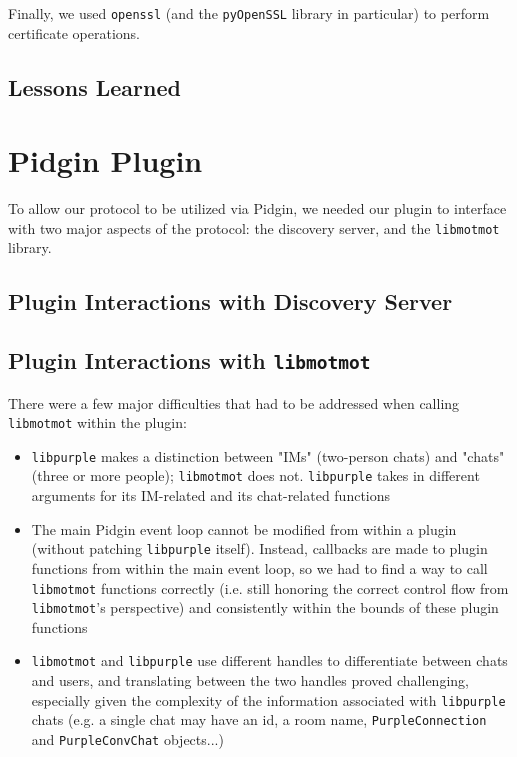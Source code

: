 \documentclass{sig-alternate}
\newcommand\libmotmot{\texttt{libmotmot}\xspace}
\newcommand\libpurple{\texttt{libpurple}\xspace}
\begin{document}
Finally, we used \texttt{openssl} (and the \texttt{pyOpenSSL} library in
particular) to perform certificate operations.

\subsection{Lessons Learned}


\section{Pidgin Plugin}

To allow our protocol to be utilized via Pidgin, we needed our plugin to
interface with two major aspects of the protocol: the discovery server, and the
\libmotmot library.

\subsection{Plugin Interactions with Discovery Server}


\subsection{Plugin Interactions with \libmotmot}
There were a few major difficulties that had to be addressed when calling
\libmotmot within the plugin:

\begin{itemize}
\item \libpurple makes a distinction between "IMs" (two-person chats) and
"chats" (three or more people); \libmotmot does not.  \libpurple takes in
different arguments for its IM-related and its chat-related functions

\item The main Pidgin event loop cannot be modified from within a plugin
(without patching \libpurple itself).  Instead, callbacks are made to plugin
functions from within the main event loop, so we had to find a way to call
\libmotmot functions correctly (i.e. still honoring the correct control flow
from \libmotmot's perspective) and consistently within the bounds of these
plugin functions

\item \libmotmot and \libpurple use different handles to differentiate between
chats and users, and translating between the two handles proved challenging,
especially given the complexity of the information associated with \libpurple
chats (e.g. a single chat may have an id, a room name, \verb`PurpleConnection`
and \verb`PurpleConvChat` objects...)

\end{itemize}
\end{document}
